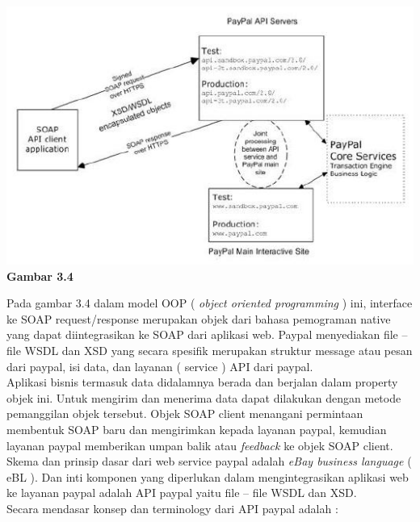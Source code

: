 \begin{center}
\includegraphics[scale=1]{Gambar34.jpg}\\
\textbf{Gambar 3.4}
\end{center}
\tab Pada gambar 3.4 dalam model OOP ( \textit{object oriented programming} ) ini, interface ke SOAP request/response merupakan objek dari bahasa pemograman native yang dapat diintegrasikan ke SOAP dari aplikasi web. Paypal menyediakan file – file WSDL dan XSD yang secara spesifik merupakan struktur message atau pesan dari paypal, isi data, dan layanan ( service ) API dari paypal.\\
\tab Aplikasi bisnis termasuk data didalamnya berada dan berjalan dalam property objek ini. Untuk mengirim dan menerima data dapat dilakukan dengan metode pemanggilan objek tersebut. Objek SOAP client menangani permintaan membentuk SOAP baru dan mengirimkan kepada layanan paypal, kemudian layanan paypal memberikan umpan balik atau \textit{feedback} ke objek SOAP client.\\
\tab Skema dan prinsip dasar dari web service paypal adalah \textit{eBay business language} ( eBL ). Dan inti komponen yang diperlukan dalam mengintegrasikan aplikasi web ke layanan paypal adalah API paypal yaitu file – file WSDL dan XSD.\\
\tab Secara mendasar konsep dan terminology dari API paypal adalah :\\
